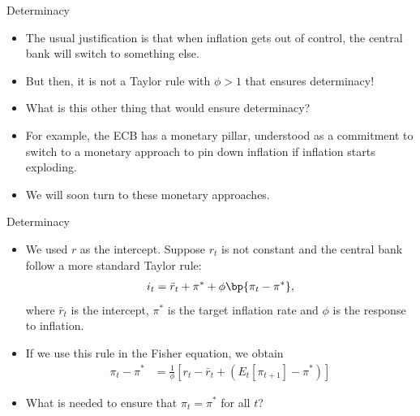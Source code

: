 \documentclass[11pt,xcolor={dvipsnames},aspectratio=159,hyperref={pdftex,pdfpagemode=UseNone,hidelinks,pdfdisplaydoctitle=true},usepdftitle=false]{beamer}
\begin{document}
        \begin{frame}{Determinacy}
            \begin{itemize}
                    \item The usual justification is that when inflation gets out of control, the central bank will switch to something else.
                    \item But then, it is not a Taylor rule with $\phi>1$ that ensures determinacy!
                    \item What is this other thing that would ensure determinacy?
                    \item For example, the ECB has a monetary pillar, understood as a commitment to switch to a monetary approach to pin down inflation if inflation starts exploding.
                    \item We will soon turn to these monetary approaches.
                \end{itemize}
            \end{frame}


        \begin{frame}{Determinacy}
        \begin{itemize}
                \item We used $r$ as the intercept. Suppose $r_t$ is not constant and the central bank follow a more standard Taylor rule: 
                \begin{align*}
                    i_t = \bar{r}_t + \pi^* + \phi \bp{\pi_t-\pi^*},
                \end{align*}
                where $\bar{r}_t$ is the intercept, $\pi^*$ is the target inflation rate and $\phi$ is the response to inflation.
                \item If we use this rule in the Fisher equation, we obtain \begin{align*}
                   \pi_{t}-\pi^{*} & =\frac{1}{\phi}\left[r_{t}-\bar{r}_t+\left(E_{t}\left[\pi_{t+1}\right]-\pi^{*}\right)\right]
                \end{align*}
                \item What is needed to ensure that $\pi_t = \pi^*$ for all $t$?
            \end{itemize}
        \end{frame}
\end{document}
